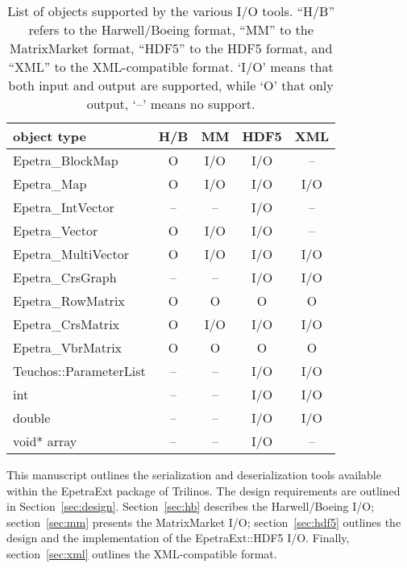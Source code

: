 \documentclass[11pt,relax]{SANDreport}
\begin{document}
\begin{table}
\begin{center}
\begin{tabular}{|l | c | c | c | c |}
\hline
object type           & H/B       & MM        & HDF5  & XML\\
\hline
Epetra\_BlockMap      & O  & I/O & I/O & --  \\
Epetra\_Map           & O  & I/O & I/O & I/O \\
Epetra\_IntVector     & -- & --  & I/O & --  \\
Epetra\_Vector        & O  & I/O & I/O & --  \\
Epetra\_MultiVector   & O  & I/O & I/O & I/O \\
Epetra\_CrsGraph      & -- & --  & I/O & I/O \\
Epetra\_RowMatrix     & O  &   O &   O &   O \\
Epetra\_CrsMatrix     & O  & I/O & I/O & I/O \\
Epetra\_VbrMatrix     & O  &   O &   O &   O \\
Teuchos::ParameterList& -- & --  & I/O & I/O \\
int                   & -- & --  & I/O & I/O \\
double                & -- & --  & I/O & I/O \\
void* array           & -- & --  & I/O &  -- \\
\hline
\end{tabular}
\caption{List of objects supported by the various I/O tools. ``H/B'' refers to
  the Harwell/Boeing format, ``MM'' to the MatrixMarket format, ``HDF5''
    to the HDF5 format, and ``XML'' to the XML-compatible format. 
    `I/O' means that both input and output are supported,
       while `O' that only output, `--' means no support.}
\label{tab:supported}
\end{center}
\end{table}

\smallskip

This manuscript outlines the serialization and deserialization tools available
within the EpetraExt package of Trilinos. The design requirements are outlined
in Section~\ref{sec:design}.
Section~\ref{sec:hb} describes the
Harwell/Boeing I/O; section~\ref{sec:mm} presents the MatrixMarket I/O;
section~\ref{sec:hdf5} outlines the design and the implementation of the
EpetraExt::HDF5 I/O. Finally, section~\ref{sec:xml} outlines the
XML-compatible format.

\end{document}
